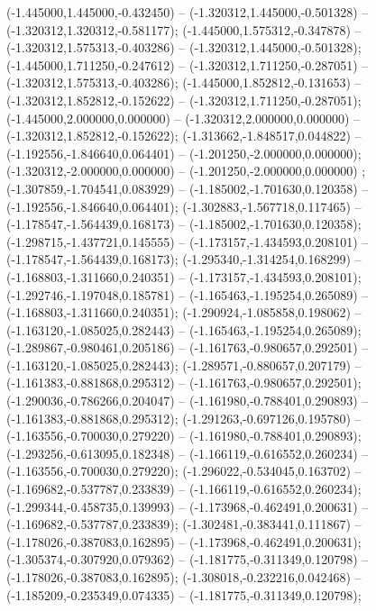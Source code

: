  (-1.445000,1.445000,-0.432450) -- (-1.320312,1.445000,-0.501328) -- (-1.320312,1.320312,-0.581177);
 (-1.445000,1.575312,-0.347878) -- (-1.320312,1.575313,-0.403286) -- (-1.320312,1.445000,-0.501328);
 (-1.445000,1.711250,-0.247612) -- (-1.320312,1.711250,-0.287051) -- (-1.320312,1.575313,-0.403286);
 (-1.445000,1.852812,-0.131653) -- (-1.320312,1.852812,-0.152622) -- (-1.320312,1.711250,-0.287051);
 (-1.445000,2.000000,0.000000) -- (-1.320312,2.000000,0.000000) -- (-1.320312,1.852812,-0.152622);
 (-1.313662,-1.848517,0.044822) -- (-1.192556,-1.846640,0.064401) -- (-1.201250,-2.000000,0.000000);
 (-1.320312,-2.000000,0.000000) -- (-1.201250,-2.000000,0.000000) ;
 (-1.307859,-1.704541,0.083929) -- (-1.185002,-1.701630,0.120358) -- (-1.192556,-1.846640,0.064401);
 (-1.302883,-1.567718,0.117465) -- (-1.178547,-1.564439,0.168173) -- (-1.185002,-1.701630,0.120358);
 (-1.298715,-1.437721,0.145555) -- (-1.173157,-1.434593,0.208101) -- (-1.178547,-1.564439,0.168173);
 (-1.295340,-1.314254,0.168299) -- (-1.168803,-1.311660,0.240351) -- (-1.173157,-1.434593,0.208101);
 (-1.292746,-1.197048,0.185781) -- (-1.165463,-1.195254,0.265089) -- (-1.168803,-1.311660,0.240351);
 (-1.290924,-1.085858,0.198062) -- (-1.163120,-1.085025,0.282443) -- (-1.165463,-1.195254,0.265089);
 (-1.289867,-0.980461,0.205186) -- (-1.161763,-0.980657,0.292501) -- (-1.163120,-1.085025,0.282443);
 (-1.289571,-0.880657,0.207179) -- (-1.161383,-0.881868,0.295312) -- (-1.161763,-0.980657,0.292501);
 (-1.290036,-0.786266,0.204047) -- (-1.161980,-0.788401,0.290893) -- (-1.161383,-0.881868,0.295312);
 (-1.291263,-0.697126,0.195780) -- (-1.163556,-0.700030,0.279220) -- (-1.161980,-0.788401,0.290893);
 (-1.293256,-0.613095,0.182348) -- (-1.166119,-0.616552,0.260234) -- (-1.163556,-0.700030,0.279220);
 (-1.296022,-0.534045,0.163702) -- (-1.169682,-0.537787,0.233839) -- (-1.166119,-0.616552,0.260234);
 (-1.299344,-0.458735,0.139993) -- (-1.173968,-0.462491,0.200631) -- (-1.169682,-0.537787,0.233839);
 (-1.302481,-0.383441,0.111867) -- (-1.178026,-0.387083,0.162895) -- (-1.173968,-0.462491,0.200631);
 (-1.305374,-0.307920,0.079362) -- (-1.181775,-0.311349,0.120798) -- (-1.178026,-0.387083,0.162895);
 (-1.308018,-0.232216,0.042468) -- (-1.185209,-0.235349,0.074335) -- (-1.181775,-0.311349,0.120798);
